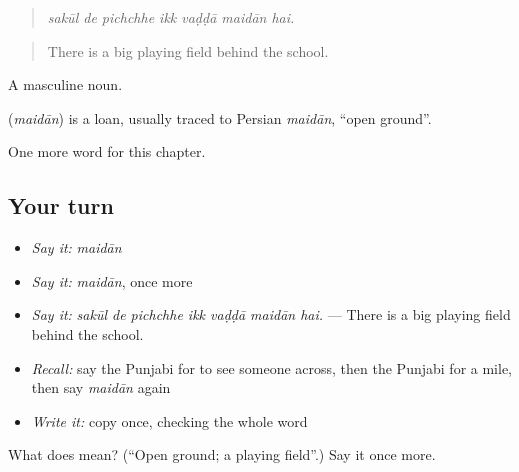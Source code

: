 \begin{quote}
      
\end{quote}

\begin{quote}
\emph{sakūl de pichchhe ikk vaḍḍā maidān hai.}
\end{quote}

\begin{quote}
There is a big playing field behind the school.
\end{quote}

A masculine noun.

\begin{cousinweb}
\textbf{} (\emph{maidān}) is a loan, usually traced to Persian \emph{maidān}, \textquotedblleft{}open ground\textquotedblright{}.
\end{cousinweb}

\begin{grammarlens}[title={What you've built}]
One more word for this chapter.
\end{grammarlens}

\subsection*{Your turn}
\begin{itemize}
\raggedright
  \item \emph{Say it:} \emph{maidān}
  \item \emph{Say it:} \emph{maidān}, once more
  \item \emph{Say it:} \emph{sakūl de pichchhe ikk vaḍḍā maidān hai.} — There is a big playing field behind the school.
  \item \emph{Recall:} say the Punjabi for to see someone across, then the Punjabi for a mile, then say \emph{maidān} again
  \item \emph{Write it:} copy \textbf{} once, checking the whole word
\end{itemize}

\begin{tcolorbox}[breakable,colback=teal!4,colframe=teal!35!black,title={Before you move on}]
What does  mean? (\textquotedblleft{}Open ground; a playing field\textquotedblright{}.) Say it once more.
\end{tcolorbox}
